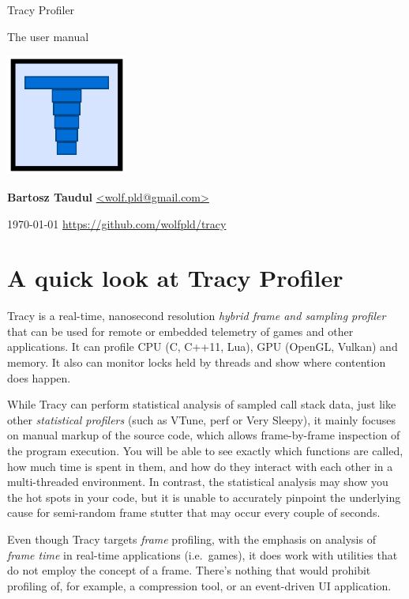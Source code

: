 \documentclass[hidelinks,titlepage,a4paper]{article}
\begin{document}
\begin{titlepage}
\centering
{\fontsize{120}{140}\selectfont Tracy Profiler}

\vspace{50pt} {\Huge{}\selectfont The user manual}

\vfill \includegraphics[height=40mm]{../icon/icon}

\vfill
\large\textbf{Bartosz Taudul} \href{mailto:wolf.pld@gmail.com}{<wolf.pld@gmail.com>}

\vspace{10pt}
\today
\vfill
\url{https://github.com/wolfpld/tracy}
\end{titlepage}

\tableofcontents

\newpage

\section{A quick look at Tracy Profiler}

Tracy is a real-time, nanosecond resolution \emph{hybrid frame and sampling profiler} that can be used for remote or embedded telemetry of games and other applications. It can profile CPU (C, C++11, Lua), GPU (OpenGL, Vulkan) and memory. It also can monitor locks held by threads and show where contention does happen.

While Tracy can perform statistical analysis of sampled call stack data, just like other \emph{statistical profilers} (such as VTune, perf or Very Sleepy), it mainly focuses on manual markup of the source code, which allows frame-by-frame inspection of the program execution. You will be able to see exactly which functions are called, how much time is spent in them, and how do they interact with each other in a multi-threaded environment. In contrast, the statistical analysis may show you the hot spots in your code, but it is unable to accurately pinpoint the underlying cause for semi-random frame stutter that may occur every couple of seconds.

Even though Tracy targets \emph{frame} profiling, with the emphasis on analysis of \emph{frame time} in real-time applications (i.e.~games), it does work with utilities that do not employ the concept of a frame. There's nothing that would prohibit profiling of, for example, a compression tool, or an event-driven UI application.
\end{document}
